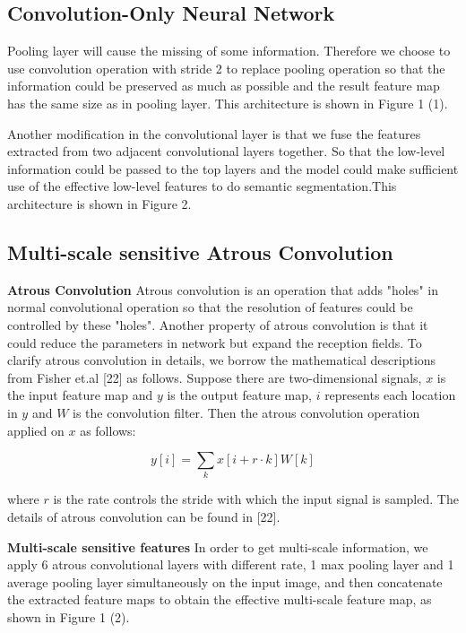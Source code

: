 \documentclass{article}
\begin{document}
\subsection{Convolution-Only Neural Network}

Pooling layer will cause the missing of some information. Therefore we choose to use convolution operation with stride 2 to replace pooling operation so that the information could be preserved as much as possible and the result feature map has the same size as in pooling layer. This architecture is shown in Figure 1 (1).

Another modification in the convolutional layer is that we fuse the features extracted from two adjacent convolutional layers together. So that the low-level information could be passed to the top layers and the model could make sufficient use of the effective low-level features to do semantic segmentation.This architecture is shown in Figure 2.

\subsection{Multi-scale sensitive Atrous Convolution}

{\bfseries Atrous Convolution} Atrous convolution is an operation that adds "holes" in normal convolutional operation so that the resolution of features could be controlled by these "holes". Another property of atrous convolution is that it could reduce the parameters in network but expand the reception fields. To clarify atrous convolution in details, we borrow the mathematical descriptions from Fisher et.al [22] as follows. Suppose there are two-dimensional signals, $x$ is the input feature map and $y$ is the output feature map, $i$ represents each location in $y$ and $W$ is the convolution filter. Then the atrous convolution operation applied on $x$ as follows:

\begin{equation}
    y [ i ] = \sum _ { k } x [ i + r \cdot k ] W [ k ]
\end{equation}

where $r$ is the rate controls the stride with which the input signal is sampled. The details of atrous convolution can be found in [22].

{\bfseries Multi-scale sensitive features} In order to get multi-scale information, we apply 6 atrous convolutional layers with different rate, 1 max pooling layer and 1 average pooling layer simultaneously on the input image, and then concatenate the extracted feature maps to obtain the effective multi-scale feature map, as shown in Figure 1 (2).
\end{document}

